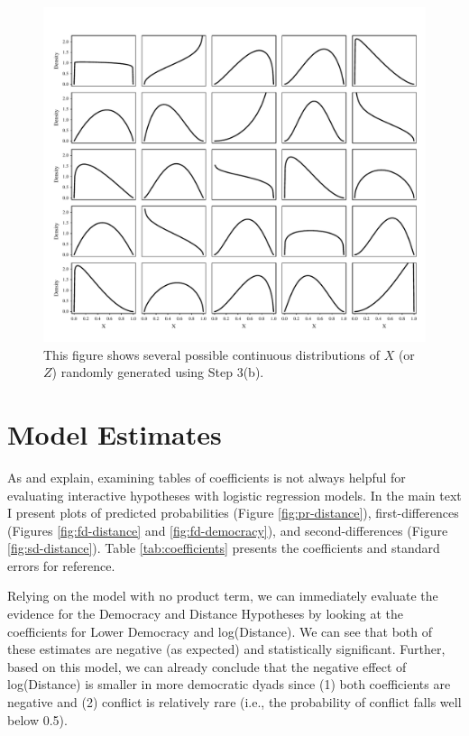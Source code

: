 \documentclass[12pt]{article}
\begin{document}
\begin{appendix}
                                \begin{figure}[h]
        \begin{center}
        \includegraphics[width = \linewidth]{fig/fig-distribution-sample.pdf}
        \end{center}\caption{This figure shows several possible continuous distributions of $X$ (or $Z$) randomly generated using Step 3(b). }\label{fig:distribution-sample}
        \end{figure}
        
\clearpage        
        
\section{Model Estimates}

As \cite{BramborClarkGolder2006} and \cite{BerryDeMerittEsarey2010} explain, examining tables of coefficients is not always helpful for evaluating interactive hypotheses with logistic regression models. In the main text I present plots of predicted probabilities (Figure \ref{fig:pr-distance}), first-differences (Figures \ref{fig:fd-distance} and \ref{fig:fd-democracy}), and second-differences (Figure \ref{fig:sd-distance}). Table \ref{tab:coefficients} presents the coefficients and standard errors for reference.

Relying on the model with no product term, we can immediately evaluate the evidence for the Democracy and Distance Hypotheses by looking at the coefficients for Lower Democracy and log(Distance). We can see that both of these estimates are negative (as expected) and statistically significant. Further, based on this model, we can already conclude that the negative effect of log(Distance) is smaller in more democratic dyads since (1) both coefficients are negative and (2) conflict is relatively rare (i.e., the probability of conflict falls well below 0.5).


\end{appendix}
\end{document}
